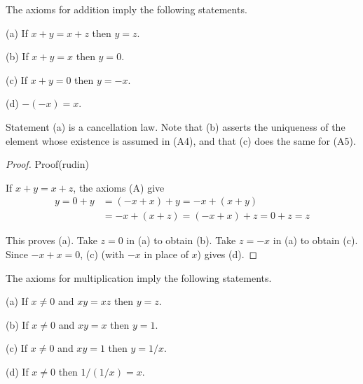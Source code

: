 \begin{myProposition}\label{myProposition:1.14}
The axioms for addition imply the following statements.

(a) If $x+y=x+z$ then $y=z$.

(b) If $x+y=x$ then $y=0$.

(c) If $x+y=0$ then $y= -x$.

(d) $-(-x)=x$.
\end{myProposition}

Statement (a) is a cancellation law. Note that (b) asserts the uniqueness
of the element whose existence is assumed in (A4), and that (c) does the same
for (A5).



\begin{proof}
    Proof(rudin)

If $x + y =x + z$, the axioms (A) give
\begin{align*}
    y =0+y&=(-x+x)+y=-x+(x+y)\\
    &=-x+(x+z)=(-x+x)+z=0+z=z
\end{align*}

This proves (a). Take $z = 0$ in (a) to obtain (b). Take $z= -x$ in (a) to
obtain (c).
Since $-x + x = 0$, (c) (with $-x$ in place of $x$) gives (d).
\end{proof}


\begin{myProposition}\label{Proposition:1.15}
The axioms for multiplication imply the following statements.

(a) If $x\neq0$ and $xy=xz$ then $y=z$.

(b) If $x\neq0$ and $xy=x$ then $y=1$.

(c) If $x\neq0$ and $xy=1$ then $y=1/x$.

(d) If $x\neq0$ then $1/(1/x) = x$.
\end{myProposition}

